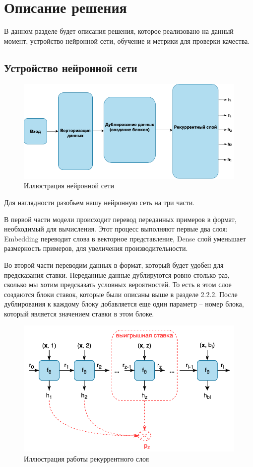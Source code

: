 \documentclass[times,specification,annotation]{itmo-student-thesis}
\begin{document}
\section{Описание решения}

В данном разделе будет описания решения, которое реализовано на данный момент, устройство нейронной сети, обучение и метрики для проверки качества.

\subsection{Устройство нейронной сети}

\begin{figure}[h]
    \caption{Иллюстрация нейронной сети}
    \centering
    \includegraphics{nn.png}
\end{figure}

Для наглядности разобьем нашу нейронную сеть на три части.

В первой части модели происходит перевод переданных примеров в формат, необходимый для вычисления. 
Этот процесс выполняют первые два слоя: Embedding переводит слова в векторное представление, 
Dense слой уменьшает размерность примеров, для увеличения производительности.

Во второй части переводим данных в формат, который будет удобен для предсказания ставки. 
Переданные данные дублируются ровно столько раз, сколько мы хотим предсказать условных вероятностей. 
То есть в этом слое создаются блоки ставок, которые были описаны выше в разделе 2.2.2.
После дублирования к каждому блоку добавляется еще один параметр – номер блока, который является значением ставки в этом блоке.


\begin{figure}[h]
    \caption{Иллюстрация работы рекуррентного слоя}
    \centering
    \includegraphics{nn_rnn_layer.png}
\end{figure}
\end{document}
